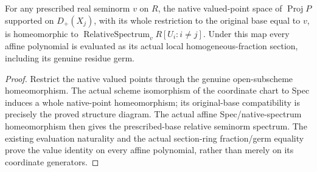 \begin{theorem}
\label{projective:native-relative-coordinate-chart}
\leanok
{}
For any prescribed real seminorm $v$ on $R$, the native valued-point space
of $\operatorname{Proj}P$ supported on $D_+(X_j)$, with its whole
restriction to the original base equal to $v$, is homeomorphic to
$\operatorname{RelativeSpectrum}_v R[U_i:i\ne j]$. Under this map every
affine polynomial is evaluated as its actual local homogeneous-fraction
section, including its genuine residue germ.
\end{theorem}
\begin{proof}
Restrict the native valued points through the genuine open-subscheme
homeomorphism. The actual scheme isomorphism of the coordinate chart to
Spec induces a whole native-point homeomorphism; its original-base
compatibility is precisely the proved structure diagram.
The actual affine Spec/native-spectrum homeomorphism then gives the
prescribed-base relative seminorm spectrum. The existing evaluation
naturality and the actual section-ring fraction/germ equality prove the
value identity on every affine polynomial, rather than merely on its
coordinate generators.
\end{proof}

